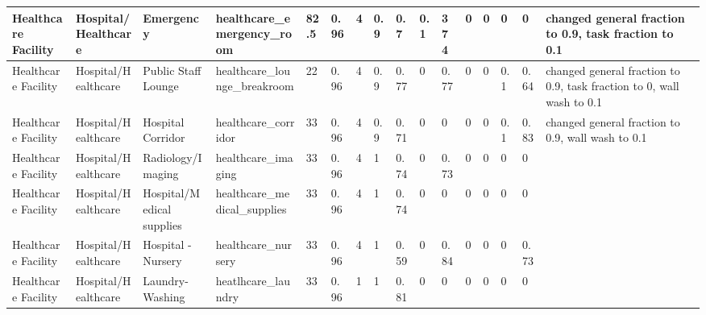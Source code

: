 \begin{center}
\begin{landscape}
\begin{longtable}{|p{0.75in}|p{0.75in}|p{0.75in}|p{0.75in}|p{0.3in}|p{0.3in}|p{0.3in}|p{0.3in}|p{0.3in}|p{0.3in}|p{0.3in}|p{0.3in}|p{0.3in}|p{0.3in}|p{0.3in}|p{0.6in}|}
      Healthcare Facility                     & Hospital/Healthcare         & Emergency                                       & healthcare\_emergency\_room                                     & 82.5 & 0.96 & 4  & 0.9    & 0.7   & 0.1   & 374   & 0    & 0    & 0    & 0    & changed general fraction to 0.9, task fraction to 0.1                                 \\ \hline
      Healthcare Facility                     & Hospital/Healthcare         & Public  Staff Lounge                            & healthcare\_lounge\_breakroom                                   & 22   & 0.96 & 4  & 0.9    & 0.77  & 0     & 0.77  & 0    & 0    & 0.1  & 0.64 & changed general fraction to 0.9, task fraction to 0, wall wash to 0.1                 \\ \hline
      Healthcare Facility                     & Hospital/Healthcare         & Hospital Corridor                               & healthcare\_corridor                                            & 33   & 0.96 & 4  & 0.9    & 0.71  & 0     & 0     & 0    & 0    & 0.1  & 0.83 & changed general fraction to 0.9, wall wash to 0.1                                     \\ \hline
      Healthcare Facility                     & Hospital/Healthcare         & Radiology/Imaging                               & healthcare\_imaging                                             & 33   & 0.96 & 4  & 1      & 0.74  & 0     & 0.73  & 0    & 0    & 0    & 0    &                                                                                       \\ \hline
      Healthcare Facility                     & Hospital/Healthcare         & Hospital/Medical supplies                       & healthcare\_medical\_supplies                                   & 33   & 0.96 & 4  & 1      & 0.74  & 0     & 0     & 0    & 0    & 0    & 0    &                                                                                       \\ \hline
      Healthcare Facility                     & Hospital/Healthcare         & Hospital - Nursery                              & healthcare\_nursery                                             & 33   & 0.96 & 4  & 1      & 0.59  & 0     & 0.84  & 0    & 0    & 0    & 0.73 &                                                                                       \\ \hline
      Healthcare Facility                     & Hospital/Healthcare         & Laundry-Washing                                 & heatlhcare\_laundry                                             & 33   & 0.96 & 1  & 1      & 0.81  & 0     & 0     & 0    & 0    & 0    & 0    &                                                                                       \\ \hline

\end{longtable}
\end{landscape}
\end{center}

